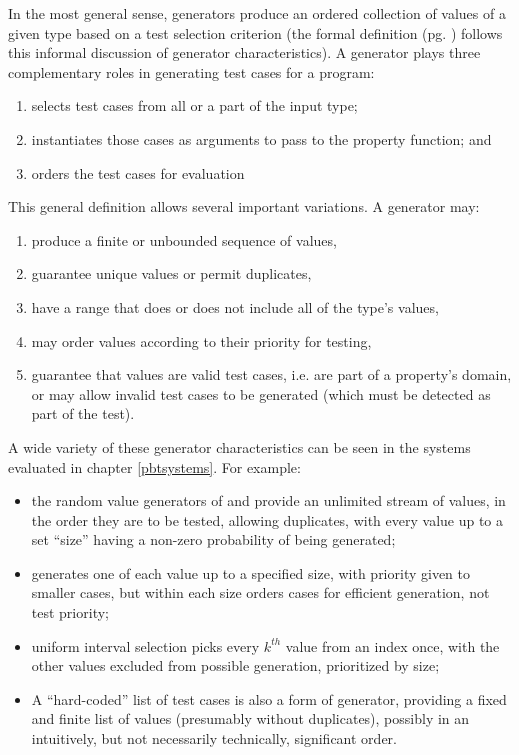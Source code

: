 In the most general sense,
generators produce an ordered 
collection of values of a given type
based on a test selection criterion
(the formal definition (pg. \pageref{sub:basegen})  
follows this informal discussion of generator characteristics).
A generator plays three complementary roles in generating test cases for a \pbt program:
\begin{enumerate}
\item selects test cases from all or a part of the input type;
\item instantiates those cases as arguments to pass to the property function; and
\item orders the test cases for evaluation
\end{enumerate}
\noindent
This general definition allows several important variations.
A generator may:

\begin{enumerate}
\item  produce a finite or unbounded sequence of values,
\item guarantee unique values or permit duplicates,
\item have a range that does or does not include all of the type's values,
\item may order values according to their priority for testing,
\item guarantee that values are valid test cases,
i.e. are part of a property's domain,
or may allow invalid test cases to be generated 
(which must be detected as part of the test).
\end{enumerate}

\noindent
A wide variety of these generator characteristics can be seen
in the \pbt systems evaluated in chapter \ref{pbtsystems}.
For example:

\begin{itemize}
\item {the random value generators of \QC and \FEAT
provide an unlimited stream of values,
in the order they are to be tested, allowing duplicates,
with every value up to a set ``size'' having a non-zero probability of being generated; }
\item { \SC generates one of each value up to a specified size,
with priority given to smaller cases, 
but within each size orders cases for efficient generation, not test priority; }
\item { \FEAT uniform interval selection picks every $k^{th}$ value from an index once,
with the other values excluded from possible generation,
prioritized by size;}
\item{ A ``hard-coded'' list of test cases is also a form of generator,
providing a fixed and finite list of values (presumably without duplicates),
possibly in an intuitively, but not necessarily technically, significant order.}
\end{itemize}

